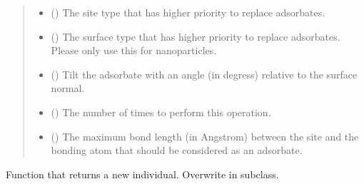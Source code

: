 \documentclass[letterpaper,10pt,english]{sphinxmanual}
\begin{document}
\begin{fulllineitems}
\begin{quote}
\begin{description}
\begin{itemize}
\item {} 
 (\sphinxstyleliteralemphasis{\sphinxupquote{, }}) \textendash{} The site type that has higher priority to replace adsorbates.

\item {} 
 (\sphinxstyleliteralemphasis{\sphinxupquote{, }}) \textendash{} The surface type that has higher priority to replace adsorbates.
Please only use this for nanoparticles.

\item {} 
 (\sphinxstyleliteralemphasis{\sphinxupquote{, }}) \textendash{} Tilt the adsorbate with an angle (in degress) relative to the
surface normal.

\item {} 
 (\sphinxstyleliteralemphasis{\sphinxupquote{, }}) \textendash{} The number of times to perform this operation.

\item {} 
 (\sphinxstyleliteralemphasis{\sphinxupquote{, }}) \textendash{} The maximum bond length (in Angstrom) between the site and the
bonding atom  that should be considered as an adsorbate.

\end{itemize}

\end{description}\end{quote}

\begin{fulllineitems}
\label{\detokenize{ga:acat.ga.adsorbate_operators.ReplaceAdsorbate.get_new_individual}}
Function that returns a new individual.
Overwrite in subclass.

\end{fulllineitems}


\end{fulllineitems}
\end{document}
